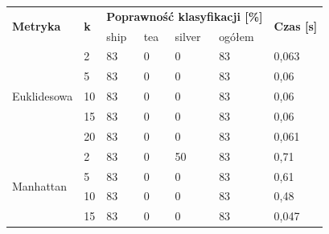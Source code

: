\documentclass{classrep}
\begin{document}
\begin{table}[!ht]
    \centering
    \begin{tabular}{|l||l|l|l|l|l|l|}
    \hline
    \multirow{2}{*}{\textbf{Metryka}} & \multirow{2}{*}{\textbf{k}} & \multicolumn{4}{l|}{\textbf{Poprawność klasyfikacji [\%]}} & \multirow{2}{*}{\textbf{Czas [s]}} \\ \cline{3-6}
                                      &                             & ship          & tea          & silver         & ogółem         &                                        \\ \hline
    \multirow{5}{*}{Euklidesowa}      & 2                           & 83            & 0            & 0              & 83             & 0,063                                  \\ \cline{2-7} 
                                      & 5                           & 83            & 0            & 0              & 83             & 0,06                                   \\ \cline{2-7} 
                                      & 10                          & 83            & 0            & 0              & 83             & 0,06                                   \\ \cline{2-7} 
                                      & 15                          & 83            & 0            & 0              & 83             & 0,06                                   \\ \cline{2-7} 
                                      & 20                          & 83            & 0            & 0              & 83             & 0,061                                  \\ \hline
    \multirow{5}{*}{Manhattan}        & 2                           & 83            & 0            & 50             & 83             & 0,71                                   \\ \cline{2-7} 
                                      & 5                           & 83            & 0            & 0              & 83             & 0,61                                   \\ \cline{2-7} 
                                      & 10                          & 83            & 0            & 0              & 83             & 0,48                                   \\ \cline{2-7} 
                                      & 15                          & 83            & 0            & 0              & 83             & 0,047                                  \\ \cline{2-7} 

\end{tabular}
\end{table}
\end{document}
